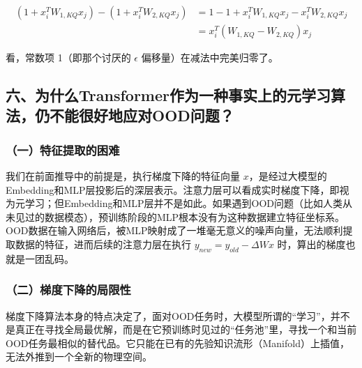 \[
\begin{aligned}
(1+x_i^TW_{1,KQ}x_j)-(1+x_i^TW_{2,KQ}x_j)
&= 1-1+x_i^TW_{1,KQ}x_j-x_i^TW_{2,KQ}x_j \\
&= x_i^T(W_{1,KQ}-W_{2,KQ})x_j
\end{aligned}
\]

看，常数项 1（即那个讨厌的 \(\epsilon\) 偏移量）在减法中完美归零了。

\hypertarget{ux516dux4e3aux4ec0ux4e48transformerux4f5cux4e3aux4e00ux79cdux4e8bux5b9eux4e0aux7684ux5143ux5b66ux4e60ux7b97ux6cd5ux4ecdux4e0dux80fdux5f88ux597dux5730ux5e94ux5bf9oodux95eeux9898}{%
\subsection{六、为什么Transformer作为一种事实上的元学习算法，仍不能很好地应对OOD问题？}\label{ux516dux4e3aux4ec0ux4e48transformerux4f5cux4e3aux4e00ux79cdux4e8bux5b9eux4e0aux7684ux5143ux5b66ux4e60ux7b97ux6cd5ux4ecdux4e0dux80fdux5f88ux597dux5730ux5e94ux5bf9oodux95eeux9898}}

\hypertarget{ux4e00ux7279ux5f81ux63d0ux53d6ux7684ux56f0ux96be}{%
\subsubsection{（一）特征提取的困难}\label{ux4e00ux7279ux5f81ux63d0ux53d6ux7684ux56f0ux96be}}

我们在前面推导中的前提是，执行梯度下降的特征向量 \(x\)，是经过大模型的Embedding和MLP层投影后的深层表示。注意力层可以看成实时梯度下降，即视为元学习；但Embedding和MLP层并不是如此。如果遇到OOD问题（比如人类从未见过的数据模态），预训练阶段的MLP根本没有为这种数据建立特征坐标系。OOD数据在输入网络后，被MLP映射成了一堆毫无意义的噪声向量，无法顺利提取数据的特征，进而后续的注意力层在执行 \(y_{new}=y_{old}-\Delta Wx\) 时，算出的梯度也就是一团乱码。

\hypertarget{ux4e8cux68afux5ea6ux4e0bux964dux7684ux5c40ux9650ux6027}{%
\subsubsection{（二）梯度下降的局限性}\label{ux4e8cux68afux5ea6ux4e0bux964dux7684ux5c40ux9650ux6027}}

梯度下降算法本身的特点决定了，面对OOD任务时，大模型所谓的``学习''，并不是真正在寻找全局最优解，而是在它预训练时见过的``任务池''里，寻找一个和当前OOD任务最相似的替代品。它只能在已有的先验知识流形（Manifold）上插值，无法外推到一个全新的物理空间。

